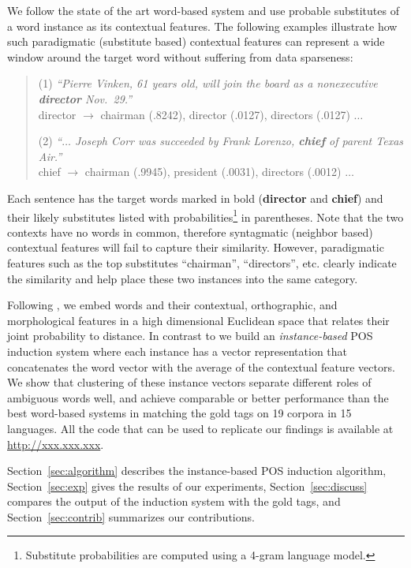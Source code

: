 We follow the state of the art word-based system
\cite{yatbaz-sert-yuret:2012:EMNLP-CoNLL} and use probable substitutes
of a word instance as its contextual features.  The following examples
illustrate how such paradigmatic (substitute based) contextual
features can represent a wide window around the target word without
suffering from data sparseness:

\begin{quotation}
(1) {\em ``Pierre Vinken, 61 years old, will join the board
  as a nonexecutive {\bf director} Nov.~29.''} 
\\ director $\rightarrow$ chairman
(.8242), director (.0127), directors (.0127) $\ldots$

(2) {\em ``$\ldots$ Joseph Corr was succeeded by Frank
  Lorenzo, {\bf chief} of parent Texas Air.''} 
\\ chief $\rightarrow$ chairman
(.9945), president (.0031), directors (.0012) $\ldots$
\end{quotation}

Each sentence has the target words marked in bold ({\bf director} and
{\bf chief}) and their likely substitutes listed with
probabilities\footnote{Substitute probabilities are computed using a
  4-gram language model.} in parentheses.  Note that the two contexts
have no words in common, therefore syntagmatic (neighbor based)
contextual features will fail to capture their similarity.  However,
paradigmatic features such as the top substitutes ``chairman'',
``directors'', etc.  clearly indicate the similarity and help place
these two instances into the same category.

Following \cite{globerson2007euclidean}, we embed words and their
contextual, orthographic, and morphological features in a high
dimensional Euclidean space that relates their joint probability to
distance.  In contrast to \cite{yatbaz-sert-yuret:2012:EMNLP-CoNLL} we
build an {\em instance-based} POS induction system where each instance
has a vector representation that concatenates the word vector with the
average of the contextual feature vectors.  We show that clustering of
these instance vectors separate different roles of ambiguous words
well, and achieve comparable or better performance than the best
word-based systems in matching the gold tags on 19 corpora in 15
languages.  All the code that can be used to replicate our findings is
available at \url{http://xxx.xxx.xxx}.

Section~\ref{sec:algorithm} describes the instance-based POS induction
algorithm, Section~\ref{sec:exp} gives the results of our experiments,
Section~\ref{sec:discuss} compares the output of the induction system
with the gold tags, and Section~\ref{sec:contrib} summarizes our
contributions.
